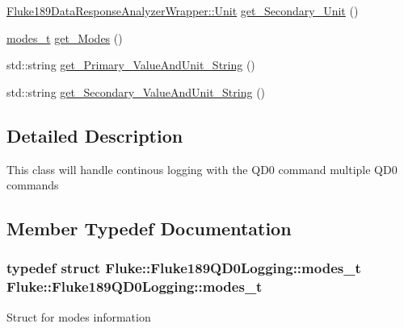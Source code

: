 \begin{DoxyCompactItemize}
\item 
\hyperlink{classFluke_1_1Fluke189DataResponseAnalyzerWrapper_ab8e5f2306e4d2ad3d741d273793aaed1}{Fluke189DataResponseAnalyzerWrapper::Unit} \hyperlink{classFluke_1_1Fluke189QD0Logging_a7d50361ed373ebaf4bf9cd7bf101f93d}{get\_\-Secondary\_\-Unit} ()
\item 
\hyperlink{structFluke_1_1Fluke189QD0Logging_1_1modes__t}{modes\_\-t} \hyperlink{classFluke_1_1Fluke189QD0Logging_a334633daaf140e8d49655e65ecd382e3}{get\_\-Modes} ()
\item 
std::string \hyperlink{classFluke_1_1Fluke189QD0Logging_a1ab6475394ca111e1afcd044d4f278e7}{get\_\-Primary\_\-ValueAndUnit\_\-String} ()
\item 
std::string \hyperlink{classFluke_1_1Fluke189QD0Logging_a5e36bbcb7bc5c45ffaf099af76c46d7e}{get\_\-Secondary\_\-ValueAndUnit\_\-String} ()
\end{DoxyCompactItemize}


\subsection{Detailed Description}
This class will handle continous logging with the QD0 command multiple QD0 commands 

\subsection{Member Typedef Documentation}
\hypertarget{classFluke_1_1Fluke189QD0Logging_aa9e03c2f5b92478c1f3182fc7b9a0a60}{
\subsubsection[{modes\_\-t}]{\setlength{\rightskip}{0pt plus 5cm}typedef struct {\bf Fluke::Fluke189QD0Logging::modes\_\-t}  {\bf Fluke::Fluke189QD0Logging::modes\_\-t}}}
\label{classFluke_1_1Fluke189QD0Logging_aa9e03c2f5b92478c1f3182fc7b9a0a60}
Struct for modes information 

